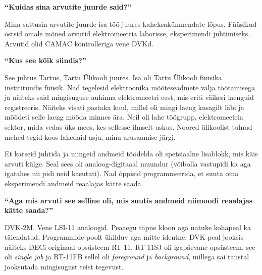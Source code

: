 
\textbf{\enquote{Kuidas sina arvutite juurde said?}}

Mina sattusin arvutite juurde isa töö juures kaheksakümnendate lõpus. Füüsikud ostsid omale mõned arvutid elektromeetria laborisse, eksperimendi juhtimiseks. Arvutid olid CAMAC kontrolleriga vene DVKd.

\textbf{\enquote{Kus see kõik sündis?}}

See juhtus Tartus, Tartu Ülikooli juures. Isa oli Tartu Ülikooli füüsika institituudis füüsik. Nad tegelesid elektroonika mõõteseadmete välja töötamisega ja näiteks said mingisuguse auhinna elektromeetri eest, mis eriti väikesi laenguid registreeris. Näiteks visati pastaka kuul, millel oli mingi laeng kusagilt läbi ja mõõdeti selle laeng mööda minnes ära. Neil oli lahe töögrupp, elektromeetria sektor, mida vedas üks mees, kes sellesse ilmselt uskus. Noored ülikoolist tulnud mehed tegid koos lahedaid asju, minu arusaamise järgi. 

Et katseid juhtida ja mingeid andmeid töödelda oli spetsiaalne lisablokk, mis käis arvuti külge. Seal sees oli analoog-digitaaal muundur (võibolla vastupidi ka aga igatahes nii pidi neid kasutati). Nad õppisid programmeerida, et suuta oma eksperimendi andmeid reaalajas kätte saada. 

\textbf{\enquote{Aga mis arvuti see selline oli, mis suutis andmeid niimoodi reaalajas kätte saada?}}

DVK-2M. Vene LSI-11 analoogid. Peaaegu täpne kloon aga natuke kohapeal ka täiendatud. Programmide poolt ühilduv aga mitte identne. DVK peal jooksis näiteks DECi originaal opsüsteem RT-11. RT-11SJ oli igapäevane opsüsteem, see oli \emph{single job} ja RT-11FB sellel oli \emph{foreground} ja \emph{background}, millega sai taustal jooksutada mingisugust teist tegevust. 

